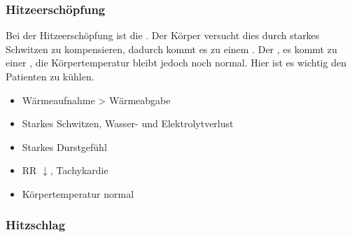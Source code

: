 % 


\subsubsection{Hitzeerschöpfung}
\label{topic:hitzeerschoepfung}

{
Bei der Hitzeerschöpfung ist die . Der Körper versucht
dies durch starkes Schwitzen zu kompensieren, dadurch kommt 
es zu einem . Der
, es kommt zu einer , die
Körpertemperatur bleibt jedoch noch normal. 
Hier ist es wichtig den Patienten zu
kühlen.

\vspace{1cm}

}{
\begin{itemize}
  \item Wärmeaufnahme {\textgreater}  Wärmeabgabe
  \item Starkes Schwitzen, Wasser- und  Elektrolytverlust
  \item Starkes Durstgefühl
  \item RR ${\downarrow}$, Tachykardie
  \item Körpertemperatur normal
\end{itemize}
}{}{}{}




% 



\subsubsection{Hitzschlag}
\label{topic:hitzschlag}

